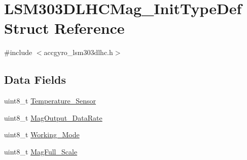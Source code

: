 \hypertarget{structLSM303DLHCMag__InitTypeDef}{\section{L\+S\+M303\+D\+L\+H\+C\+Mag\+\_\+\+Init\+Type\+Def Struct Reference}
\label{structLSM303DLHCMag__InitTypeDef}
}


{\ttfamily \#include $<$accgyro\+\_\+lsm303dlhc.\+h$>$}

\subsection*{Data Fields}
\begin{DoxyCompactItemize}
\item 
uint8\+\_\+t \hyperlink{structLSM303DLHCMag__InitTypeDef_a9eb2111bb813c41e41c4b008fa31fcb5}{Temperature\+\_\+\+Sensor}
\item 
uint8\+\_\+t \hyperlink{structLSM303DLHCMag__InitTypeDef_ae9edd3550ee6625372e2214e46603464}{Mag\+Output\+\_\+\+Data\+Rate}
\item 
uint8\+\_\+t \hyperlink{structLSM303DLHCMag__InitTypeDef_a8d09b3ff9abb633788f5c869c77b9695}{Working\+\_\+\+Mode}
\item 
uint8\+\_\+t \hyperlink{structLSM303DLHCMag__InitTypeDef_a68144d5d18ac0e3b151bcdb4ef4e8e04}{Mag\+Full\+\_\+\+Scale}
\end{DoxyCompactItemize}


